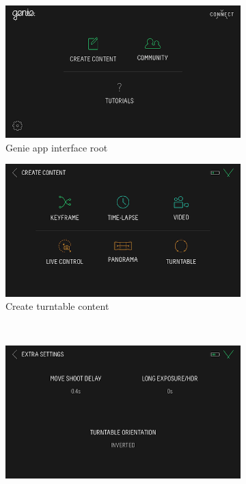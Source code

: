 \documentclass[10pt,letter,english]{article}
\begin{document}
\begin{figure}[H]
     \centering
     \begin{subfigure}[b]{0.48\textwidth}
         \centering
         \includegraphics[width=\textwidth]{Figures/genie_root.PNG}
         \caption{Genie app interface root}
         \label{genie_root}
     \end{subfigure}%
\hfill
     \begin{subfigure}[b]{0.48\textwidth}
         \centering
         \includegraphics[width=\textwidth]{Figures/genie_create.PNG}
         \caption{Create turntable content}
         \label{genie_content}
     \end{subfigure}
\\
    \begin{subfigure}[b]{0.48\textwidth}
         \centering
         \includegraphics[width=\textwidth]{Figures/genie_settings.PNG}

\end{subfigure}
\end{figure}
\end{document}
